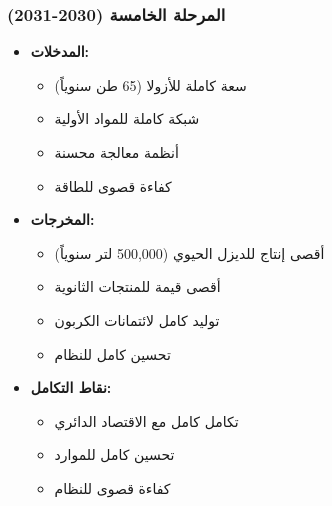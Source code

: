 \subsubsection{المرحلة الخامسة (2030-2031)}
\begin{itemize}
    \item \textbf{المدخلات:}
    \begin{itemize}
        \item سعة كاملة للأزولا (65 طن سنوياً)
        \item شبكة كاملة للمواد الأولية
        \item أنظمة معالجة محسنة
        \item كفاءة قصوى للطاقة
    \end{itemize}
    \item \textbf{المخرجات:}
    \begin{itemize}
        \item أقصى إنتاج للديزل الحيوي (500,000 لتر سنوياً)
        \item أقصى قيمة للمنتجات الثانوية
        \item توليد كامل لائتمانات الكربون
        \item تحسين كامل للنظام
    \end{itemize}
    \item \textbf{نقاط التكامل:}
    \begin{itemize}
        \item تكامل كامل مع الاقتصاد الدائري
        \item تحسين كامل للموارد
        \item كفاءة قصوى للنظام
    \end{itemize}
\end{itemize}
